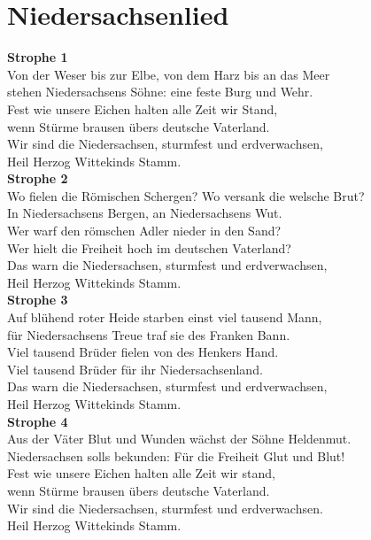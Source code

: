\documentclass[twoside,8pt]{scrartcl}
\begin{document}
\clearpage
\section{Niedersachsenlied}
\textbf{Strophe 1}\\
Von der Weser bis zur Elbe, von dem Harz bis an das Meer\\
stehen Niedersachsens Söhne: eine feste Burg und Wehr.\\
Fest wie unsere Eichen halten alle Zeit wir Stand,\\
wenn Stürme brausen übers deutsche Vaterland.\\
Wir sind die Niedersachsen, sturmfest und erdverwachsen,\\
Heil Herzog Wittekinds Stamm.\\
\newline
\textbf{Strophe 2}\\
Wo fielen die Römischen Schergen? Wo versank die welsche Brut?\\
In Niedersachsens Bergen, an Niedersachsens Wut.\\
Wer warf den römschen Adler nieder in den Sand?\\
Wer hielt die Freiheit hoch im deutschen Vaterland?\\
Das warn die Niedersachsen, sturmfest und erdverwachsen,\\
Heil Herzog Wittekinds Stamm.\\
\newline
\textbf{Strophe 3}\\
Auf blühend roter Heide starben einst viel tausend Mann,\\
für Niedersachsens Treue traf sie des Franken Bann.\\
Viel tausend Brüder fielen von des Henkers Hand.\\
Viel tausend Brüder für ihr Niedersachsenland.\\
Das warn die Niedersachsen, sturmfest und erdverwachsen,\\
Heil Herzog Wittekinds Stamm.\\
\newline
\textbf{Strophe 4}\\
Aus der Väter Blut und Wunden wächst der Söhne Heldenmut.\\
Niedersachsen solls bekunden: Für die Freiheit Glut und Blut!\\
Fest wie unsere Eichen halten alle Zeit wir stand,\\
wenn Stürme brausen übers deutsche Vaterland.\\
Wir sind die Niedersachsen, sturmfest und erdverwachsen.\\
Heil Herzog Wittekinds Stamm.\\
\end{document}
